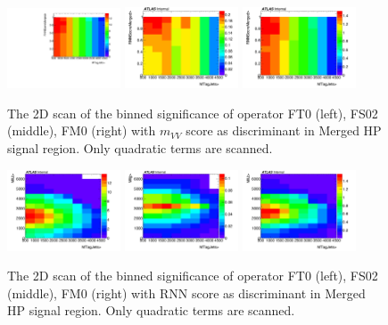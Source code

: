 \begin{figure}[ht]
    \centering
    	\includegraphics[width=0.30\textwidth]{figures/aQGC/HPSRFT0MVV.pdf}
    	\includegraphics[width=0.30\textwidth]{figures/aQGC/HPSRFS02MVV.pdf}
    	\includegraphics[width=0.30\textwidth]{figures/aQGC/HPSRFM0MVV.pdf}
        \caption{The 2D scan of the binned significance of operator FT0 (left), FS02 (middle), FM0 (right) with $m_{VV}$ score as discriminant in Merged HP signal region. Only quadratic terms are scanned.}
        \label{fig:2lepaQGCBinnedSigMVV}
\end{figure}

\begin{figure}[ht]
    \centering
    	\includegraphics[width=0.30\textwidth]{figures/aQGC/HPSRFT0RNN.pdf}
    	\includegraphics[width=0.30\textwidth]{figures/aQGC/HPSRFS02RNN.pdf}
    	\includegraphics[width=0.30\textwidth]{figures/aQGC/HPSRFM0RNN.pdf}
        \caption{The 2D scan of the binned significance of operator FT0 (left), FS02 (middle), FM0 (right) with RNN score as discriminant in Merged HP signal region. Only quadratic terms are scanned.}
        \label{fig:2lepaQGCBinnedSigRNN}
\end{figure}

